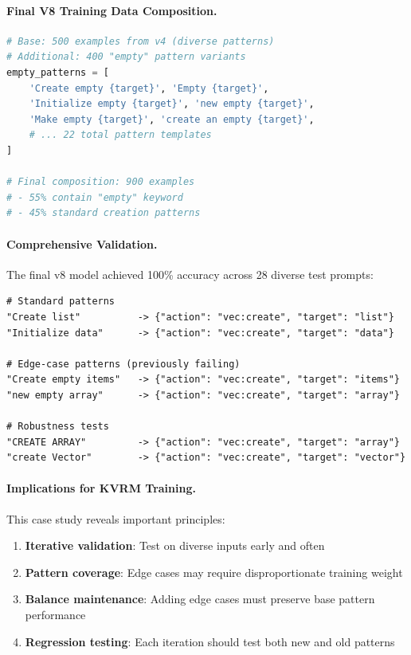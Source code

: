 \documentclass[11pt,a4paper]{article}
\begin{document}
\paragraph{Final V8 Training Data Composition.}
\begin{lstlisting}[language=Python,caption={Create V8 Training Data Strategy}]
# Base: 500 examples from v4 (diverse patterns)
# Additional: 400 "empty" pattern variants
empty_patterns = [
    'Create empty {target}', 'Empty {target}',
    'Initialize empty {target}', 'new empty {target}',
    'Make empty {target}', 'create an empty {target}',
    # ... 22 total pattern templates
]

# Final composition: 900 examples
# - 55% contain "empty" keyword
# - 45% standard creation patterns
\end{lstlisting}

\paragraph{Comprehensive Validation.} The final v8 model achieved 100\% accuracy across 28 diverse test prompts:

\begin{lstlisting}
# Standard patterns
"Create list"          -> {"action": "vec:create", "target": "list"}
"Initialize data"      -> {"action": "vec:create", "target": "data"}

# Edge-case patterns (previously failing)
"Create empty items"   -> {"action": "vec:create", "target": "items"}
"new empty array"      -> {"action": "vec:create", "target": "array"}

# Robustness tests
"CREATE ARRAY"         -> {"action": "vec:create", "target": "array"}
"create Vector"        -> {"action": "vec:create", "target": "vector"}
\end{lstlisting}

\paragraph{Implications for KVRM Training.} This case study reveals important principles:
\begin{enumerate}
    \item \textbf{Iterative validation}: Test on diverse inputs early and often
    \item \textbf{Pattern coverage}: Edge cases may require disproportionate training weight
    \item \textbf{Balance maintenance}: Adding edge cases must preserve base pattern performance
    \item \textbf{Regression testing}: Each iteration should test both new and old patterns
\end{enumerate}
\end{document}
